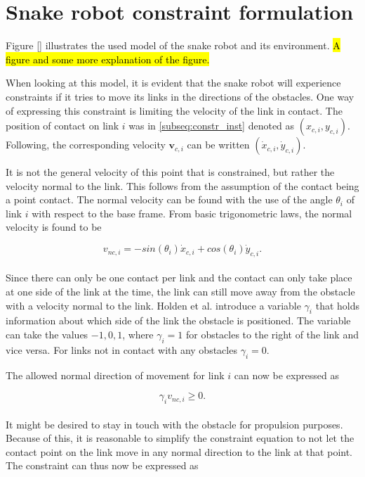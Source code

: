 \section{Snake robot constraint formulation}\label{seq:constraints}

Figure \ref{} illustrates the used model of the snake robot and its environment. \hl{A figure and some more explanation of the figure.}

When looking at this model, it is evident that the snake robot will experience constraints if it tries to move its links in the directions of the obstacles. One way of expressing this constraint is limiting the velocity of the link in contact. The position of contact on link $i$ was in \ref{subseq:constr_inst} denoted as $(x_{c,i}, y_{c,i})$. Following, the corresponding velocity $\mathbf{v}_{c,i}$ can be written $(\dot{x}_{c,i}, \dot{y}_{c,i})$.

It is not the general velocity of this point that is constrained, but rather the velocity normal to the link. This follows from the assumption of the contact being a point contact. The normal velocity can be found with the use of the angle $\theta_i$ of link $i$ with respect to the base frame. From basic trigonometric laws, the normal velocity is found to be

\begin{equation}\label{eq:norm_vel}
    v_{nc,i} = -sin(\theta_i) \dot{x}_{c,i} + cos(\theta_i) \dot{y}_{c,i}.
\end{equation}
\\
Since there can only be one contact per link and the contact can only take place at one side of the link at the time, the link can still move away from the obstacle with a velocity normal to the link. Holden et al. \cite{holden2014optimal} introduce a variable $\gamma_i$ that holds information about which side of the link the obstacle is positioned. The variable can take the values ${-1, 0, 1}$, where $\gamma_i=1$ for obstacles to the right of the link and vice versa. For links not in contact with any obstacles $\gamma_i=0$.

The allowed normal direction of movement for link $i$ can now be expressed as

\begin{equation}\label{eq:norm_vel2}
    \gamma_i v_{nc,i} \geq 0.
\end{equation}
\\
It might be desired to stay in touch with the obstacle for propulsion purposes. Because of this, it is reasonable to simplify the constraint equation to not let the contact point on the link move in any normal direction to the link at that point. The constraint can thus now be expressed as

